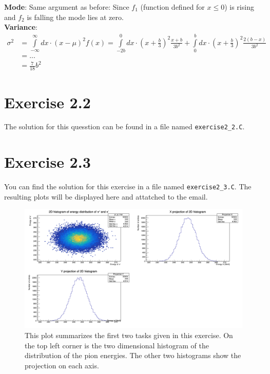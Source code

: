 \documentclass[10pt]{article}
\newenvironment{myfont}{\fontfamily{put}\selectfont}{\par}
\begin{document}
\begin{myfont}
\begin{itemize}
  \noindent \textbf{Mode}: Same argument as before: Since $f_{1}$ (function defined for $x \leq 0$) is rising and $f_{2}$ is falling the mode lies at zero. \\

  \noindent \textbf{Variance}: 
  \begin{align*}
  \sigma^{2} & = \int\limits_{-\infty}^{\infty}dx \cdot (x - \mu)^{2}f(x) = \int\limits_{-2b}^{0}dx \cdot \left(x + \frac{b}{3}\right)^{2}\frac{x+b}{3b^{2}} + \int\limits_{0}^{b}dx \cdot \left(x + \frac{b}{3}\right)^{2}\frac{2(b-x)}{3b^{2}} \\
             & = ... \\
             & = \frac{7}{18}b^{2}
  \end{align*}
\end{itemize}

\section*{Exercise 2.2}

The solution for this quesstion can be found in a file named \texttt{exercise2\_2.C}.


\section*{Exercise 2.3}

You can find the solution for this exercise in a file named \texttt{exercise2\_3.C}.
The resulting plots will be displayed here and attatched to the email.

\begin{figure}[H]
\centering
\caption{This plot summarizes the first two tasks given in this exercise.
On the top left corner is the two dimensional histogram of the distribution of the pion energies.
The other two histograms show the projection on each axis.}
\includegraphics[width = \textwidth]{./canvas.png}
\end{figure}



\end{myfont}
\end{document}
